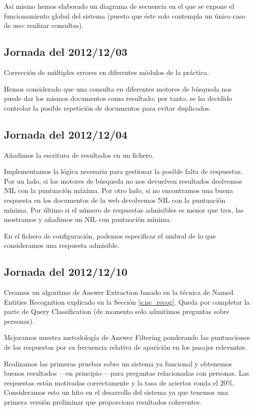 \documentclass[12pt,a4paper,titlepage]{article}
\begin{document}
Así mismo hemos elaborado un diagrama de secuencia en el que se expone el funcionamiento global del sistema (puesto que éste solo contempla un único caso de uso: realizar consultas).

\subsection{Jornada del 2012/12/03}
Corrección de múltiples errores en diferentes módulos de la práctica.

Hemos considerado que una consulta en diferentes motores de búsqueda nos puede dar los mismos documentos como resultado; por tanto, se ha decidido controlar la posible repetición de documentos para evitar duplicados.

\subsection{Jornada del 2012/12/04}
Añadimos la escritura de resultados en un fichero.

Implementamos la lógica necesaria para gestionar la posible falta de respuestas. Por un lado, si los motores de búsqueda no nos devuelven resultados deolvemos NIL con la puntuación máxima. Por otro lado, si no encontramos una buena respuesta en los documentos de la web devolvemos NIL con la puntuación mínima. Por último si el número de respuestas admisibles es menor que tres, las mostramos y añadimos un NIL con puntuación mínima.

En el fichero de configuración, podemos especificar el umbral de lo que consideramos una respuesta admisible.

\subsection{Jornada del 2012/12/10}
Creamos un algoritmo de Answer Extraction basado en la técnica de Named Entities Recognition explicado en la Sección \ref{s:ne_recog}. Queda por completar la parte de Query Classification (de momento solo admitimos preguntas sobre personas).

Mejoramos nuestra metodología de Answer Filtering ponderando las puntuaciones de las respuestas por su frecuencia relativa de aparición en los pasajes relevantes.

Realizamos las primeras pruebas sobre un sistema ya funcional y obtenemos buenos resultados ---en principio--- para preguntas relacionadas con personas. Las respuestas están motivadas correctamente y la tasa de aciertos ronda el 20\%. Consideramos esto un hito en el desarrollo del sistema ya que tenemos una primera versión preliminar que proporciona resultados coherentes.
\end{document}
